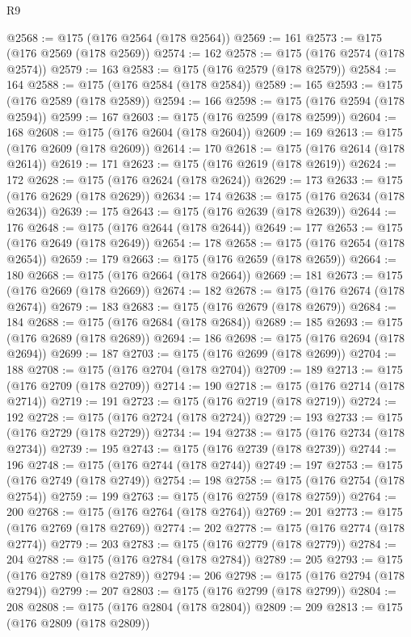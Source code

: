 \begin{lexlean}{R9}
\begin{coremodule}
@2568 := @175 (@176 @2564 (@178 @2564))
@2569 := 161
@2573 := @175 (@176 @2569 (@178 @2569))
@2574 := 162
@2578 := @175 (@176 @2574 (@178 @2574))
@2579 := 163
@2583 := @175 (@176 @2579 (@178 @2579))
@2584 := 164
@2588 := @175 (@176 @2584 (@178 @2584))
@2589 := 165
@2593 := @175 (@176 @2589 (@178 @2589))
@2594 := 166
@2598 := @175 (@176 @2594 (@178 @2594))
@2599 := 167
@2603 := @175 (@176 @2599 (@178 @2599))
@2604 := 168
@2608 := @175 (@176 @2604 (@178 @2604))
@2609 := 169
@2613 := @175 (@176 @2609 (@178 @2609))
@2614 := 170
@2618 := @175 (@176 @2614 (@178 @2614))
@2619 := 171
@2623 := @175 (@176 @2619 (@178 @2619))
@2624 := 172
@2628 := @175 (@176 @2624 (@178 @2624))
@2629 := 173
@2633 := @175 (@176 @2629 (@178 @2629))
@2634 := 174
@2638 := @175 (@176 @2634 (@178 @2634))
@2639 := 175
@2643 := @175 (@176 @2639 (@178 @2639))
@2644 := 176
@2648 := @175 (@176 @2644 (@178 @2644))
@2649 := 177
@2653 := @175 (@176 @2649 (@178 @2649))
@2654 := 178
@2658 := @175 (@176 @2654 (@178 @2654))
@2659 := 179
@2663 := @175 (@176 @2659 (@178 @2659))
@2664 := 180
@2668 := @175 (@176 @2664 (@178 @2664))
@2669 := 181
@2673 := @175 (@176 @2669 (@178 @2669))
@2674 := 182
@2678 := @175 (@176 @2674 (@178 @2674))
@2679 := 183
@2683 := @175 (@176 @2679 (@178 @2679))
@2684 := 184
@2688 := @175 (@176 @2684 (@178 @2684))
@2689 := 185
@2693 := @175 (@176 @2689 (@178 @2689))
@2694 := 186
@2698 := @175 (@176 @2694 (@178 @2694))
@2699 := 187
@2703 := @175 (@176 @2699 (@178 @2699))
@2704 := 188
@2708 := @175 (@176 @2704 (@178 @2704))
@2709 := 189
@2713 := @175 (@176 @2709 (@178 @2709))
@2714 := 190
@2718 := @175 (@176 @2714 (@178 @2714))
@2719 := 191
@2723 := @175 (@176 @2719 (@178 @2719))
@2724 := 192
@2728 := @175 (@176 @2724 (@178 @2724))
@2729 := 193
@2733 := @175 (@176 @2729 (@178 @2729))
@2734 := 194
@2738 := @175 (@176 @2734 (@178 @2734))
@2739 := 195
@2743 := @175 (@176 @2739 (@178 @2739))
@2744 := 196
@2748 := @175 (@176 @2744 (@178 @2744))
@2749 := 197
@2753 := @175 (@176 @2749 (@178 @2749))
@2754 := 198
@2758 := @175 (@176 @2754 (@178 @2754))
@2759 := 199
@2763 := @175 (@176 @2759 (@178 @2759))
@2764 := 200
@2768 := @175 (@176 @2764 (@178 @2764))
@2769 := 201
@2773 := @175 (@176 @2769 (@178 @2769))
@2774 := 202
@2778 := @175 (@176 @2774 (@178 @2774))
@2779 := 203
@2783 := @175 (@176 @2779 (@178 @2779))
@2784 := 204
@2788 := @175 (@176 @2784 (@178 @2784))
@2789 := 205
@2793 := @175 (@176 @2789 (@178 @2789))
@2794 := 206
@2798 := @175 (@176 @2794 (@178 @2794))
@2799 := 207
@2803 := @175 (@176 @2799 (@178 @2799))
@2804 := 208
@2808 := @175 (@176 @2804 (@178 @2804))
@2809 := 209
@2813 := @175 (@176 @2809 (@178 @2809))

\end{coremodule}
\end{lexlean}
